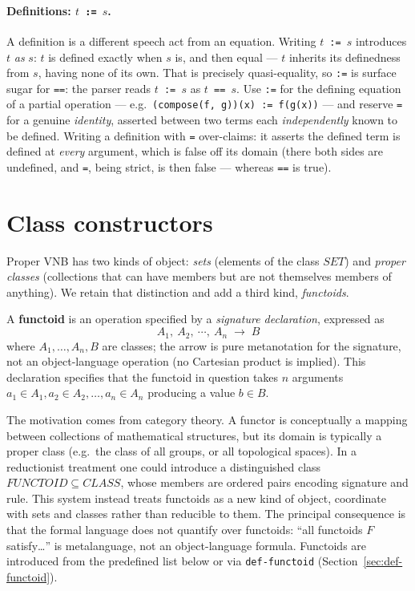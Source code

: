 \paragraph{Definitions: \texttt{$t$ := $s$}.}
A definition is a different speech act from an equation.  Writing
\texttt{$t$ := $s$} introduces $t$ \emph{as} $s$: $t$ is defined exactly when
$s$ is, and then equal --- $t$ inherits its definedness from $s$, having none
of its own.  That is precisely quasi-equality, so \texttt{:=} is surface
sugar for \texttt{==}: the parser reads \texttt{$t$ := $s$} as
\texttt{$t$ == $s$}.  Use \texttt{:=} for the defining equation of a partial
operation --- e.g.\ \texttt{(compose(f, g))(x) := f(g(x))} --- and reserve
\texttt{=} for a genuine \emph{identity}, asserted between two terms each
\emph{independently} known to be defined.  Writing a definition with
\texttt{=} over-claims: it asserts the defined term is defined at
\emph{every} argument, which is false off its domain (there both sides are
undefined, and \texttt{=}, being strict, is then false --- whereas
\texttt{==} is true).

\section{Class constructors}
\label{sec:class-set-discipline}

Proper VNB has two kinds of object: \emph{sets} (elements of
the class $\mathit{SET}$) and \emph{proper classes} (collections that can have
members but are not themselves members of anything).  We retain that
distinction and add a third kind, \emph{functoids}.

A \textbf{functoid} is an operation specified by a \emph{signature declaration},
expressed as
\[
  A_1, \ A_2, \ \cdots, \ A_n \;\to\; B
\]
where $A_1, \ldots, A_n, B$ are classes; the arrow is pure metanotation
for the signature, not an object-language operation (no Cartesian
product is implied).  This declaration specifies that the functoid in
question takes $n$ arguments $a_1 \in A_1, a_2 \in A_2, \ldots, a_n
\in A_n$ producing a value $b \in B$.

\begin{remark}
The motivation comes from category theory.  A functor is conceptually a
mapping between collections of mathematical structures, but its domain
is typically a proper class (e.g.\ the class of all groups, or all
topological spaces).  In a reductionist treatment one could introduce a
distinguished class $\mathit{FUNCTOID} \subseteq \mathit{CLASS}$,
whose members are ordered pairs encoding signature and rule.  This
system instead treats functoids as a new kind of object, coordinate
with sets and classes rather than reducible to them.  The principal
consequence is that the formal language does not quantify over
functoids: ``all functoids $F$ satisfy\ldots'' is metalanguage, not an
object-language formula.  Functoids are introduced from the predefined
list below or via \texttt{def-functoid} (Section~\ref{sec:def-functoid}).
\end{remark}

